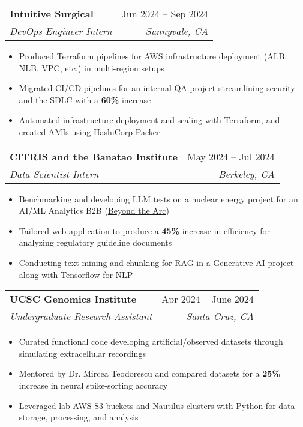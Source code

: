 \documentclass[letterpaper,11pt]{article}
\makeatletter
\newcommand{\resumeItem}[1]{
  \item\small{
    {#1 \vspace{-2pt}}
  }
}
\newcommand{\resumeSubheading}[4]{
  \vspace{-2pt}\item
    \begin{tabular*}{0.97\textwidth}[t]{l@{\extracolsep{\fill}}r}
      \textbf{#1} & #2 \\
      \textit{\small#3} & \textit{\small #4} \\
    \end{tabular*}\vspace{-7pt}
}
\newcommand{\resumeItemListStart}{\begin{itemize}}
\newcommand{\resumeItemListEnd}{\end{itemize}\vspace{-5pt}}
\makeatother
\begin{document}
\resumeSubheading
{Intuitive Surgical}{Jun 2024 -- Sep 2024}
{DevOps Engineer Intern}{Sunnyvale, CA}
\resumeItemListStart
\resumeItem{Produced Terraform pipelines for AWS infrastructure deployment (ALB, NLB, VPC, etc.) in multi-region setups}
\resumeItem{Migrated CI/CD pipelines for an internal QA project streamlining security and the SDLC with a \textbf{60\%} increase}
\resumeItem{Automated infrastructure deployment and scaling with Terraform, and created AMIs using HashiCorp Packer}
\resumeItemListEnd

\resumeSubheading
{CITRIS and the Banatao Institute}{May 2024 -- Jul 2024}
{Data Scientist Intern}{Berkeley, CA}
\resumeItemListStart
\resumeItem{Benchmarking and developing LLM tests on a nuclear energy project for an AI/ML Analytics B2B (\color[HTML]{0000EE}\href{https://beyondthearc.com}{Beyond the Arc})}
\resumeItem{Tailored web application to produce a \textbf{45\%} increase in efficiency for analyzing regulatory guideline documents}
\resumeItem{Conducting text mining and chunking for RAG in a Generative AI project along with Tensorflow for NLP}
\resumeItemListEnd

\resumeSubheading
{UCSC Genomics Institute}{Apr 2024 -- June 2024}
{Undergraduate Research Assistant}{Santa Cruz, CA}
\resumeItemListStart
\resumeItem{Curated functional code developing artificial/observed datasets through simulating extracellular recordings}
\resumeItem{Mentored by Dr. Mircea Teodorescu and compared datasets for a {\textbf{25\%}} increase in neural spike-sorting accuracy}
\resumeItem{Leveraged lab AWS S3 buckets and Nautilus clusters with Python for data storage, processing, and analysis}
\resumeItemListEnd


\end{document}
